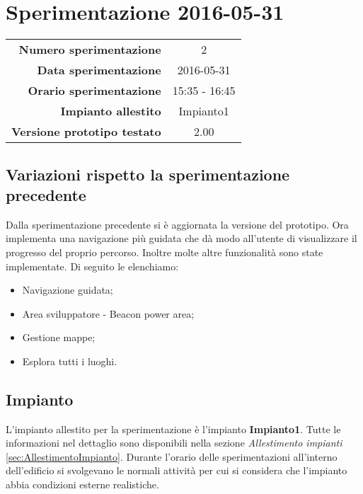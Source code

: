 \documentclass[../Sperimentazione.tex]{subfiles}
\begin{document}
	\section{Sperimentazione 2016-05-31}
	
		\begin{table} [h]
		\centering
		\begin{tabular}[width=0.5\textwidth]{r|c}
			\textbf{Numero sperimentazione} & 2 \\
			\textbf{Data sperimentazione} & 2016-05-31 \\
			\textbf{Orario sperimentazione} & 15:35 - 16:45 \\
			\textbf{Impianto allestito} & Impianto1 \\
			\textbf{Versione prototipo testato} & 2.00 \\		
		\end{tabular}
		\end{table}
		
		\subsection{Variazioni rispetto la sperimentazione precedente}
			Dalla sperimentazione precedente si è aggiornata la versione del prototipo. Ora implementa una navigazione più guidata che dà modo all'utente di visualizzare il progresso del proprio percorso. Inoltre molte altre funzionalità sono state implementate. Di seguito le elenchiamo:
			\begin{itemize}
				\item Navigazione guidata;
				\item Area sviluppatore - Beacon power area;
				\item Gestione mappe;
				\item Esplora tutti i luoghi.
			\end{itemize}
		
		\subsection{Impianto}
		L'impianto allestito per la sperimentazione è l'impianto \textbf{Impianto1}. Tutte le informazioni nel dettaglio sono disponibili nella sezione \textit{Allestimento impianti} \ref{sec:AllestimentoImpianto}. Durante l'orario delle sperimentazioni all'interno dell'edificio si svolgevano le normali attività per cui si considera che l'impianto abbia condizioni esterne realistiche.


\end{document}
